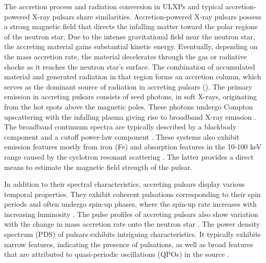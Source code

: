 \documentclass[twocolumn,trackchanges]{aastex631}
\begin{document}
The accretion process and radiation conversion in ULXPs and typical accretion-powered X-ray pulsars share similarities. Accretion-powered X-ray pulsars possess a strong magnetic field that directs the infalling matter toward the polar regions of the neutron star. Due to the intense gravitational field near the neutron star, the accreting material gains substantial kinetic energy. Eventually, depending on the mass accretion rate, the material decelerates through the gas or radiative shocks as it reaches the neutron star's surface. The combination of accumulated material and generated radiation in that region forms an accretion column, which serves as the dominant source of radiation in accreting pulsars (\citealt{2007ApJ...654..435B, 2012A&A...544A.123B,2013A&A...551A...1R}). The primary emission in accreting pulsars consists of seed photons, in soft X-rays,  originating from the hot spots above the magnetic poles. These photons undergo Compton upscattering with the infalling plasma giving rise to broadband X-ray emission \citep{2007ApJ...654..435B}. The broadband continuum spectra are typically described by a blackbody component and a cutoff power-law component \citep{2007ApJ...654..435B,2013A&A...551A...1R}. These systems also exhibit emission features mostly from iron (Fe) and absorption features in the 10-100 keV range caused by the cyclotron resonant scattering \citep{2015A&ARv..23....2W, 2016MNRAS.461L..97J, 2019A&A...622A..61S,2023MNRAS.518.5089C}. The latter provides a direct means to estimate the magnetic field strength of the pulsar.

In addition to their spectral characteristics, accreting pulsars display various temporal properties. They exhibit coherent pulsations corresponding to their spin periods and often undergo spin-up phases, where the spin-up rate increases with increasing luminosity \citep{1973ApJ...184..271L}. The pulse profiles of accreting pulsars also show variation with the change in mass accretion rate onto the neutron star \citep{1989PASJ...41....1N, 2018ApJ...863....9W, 2023MNRAS.521.3951J}. The power density spectrum (PDS) of pulsars exhibits intriguing characteristics. It typically exhibits narrow features, indicating the presence of pulsations, as well as broad features that are attributed to quasi-periodic oscillations (QPOs) in the source \citep{1987ApJ...316..411V,2008ApJ...685.1109R,2018ApJ...863....9W}.
\end{document}
